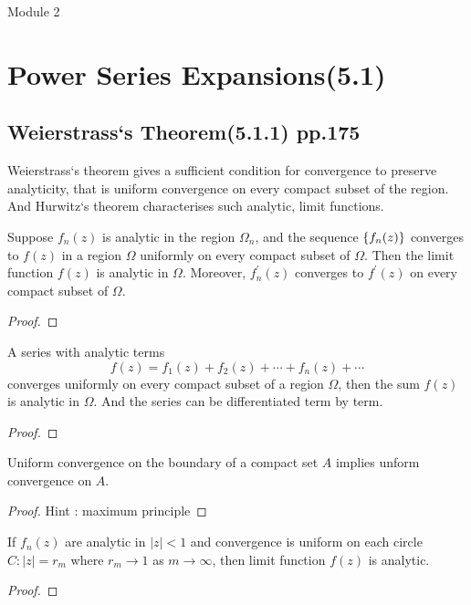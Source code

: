\pagebreak
{\Large Module 2}
\section{Power Series Expansions(5.1)}
\subsection{Weierstrass`s Theorem(5.1.1) pp.175}
\begin{important}
	Weierstrass`s theorem gives a sufficient condition for convergence to preserve analyticity, that is uniform convergence on every compact subset of the region. 
	And Hurwitz`s theorem characterises such analytic, limit functions.
\end{important}
\begin{theorem}[Weierstrass]
	Suppose $f_n(z)$ is analytic in the region $\Omega_n$, and the sequence $\left\{f_n(z)\right\}$ converges to $f(z)$ in a region $\Omega$ uniformly on every compact subset of $\Omega$. Then the limit function $f(z)$ is analytic in $\Omega$. Moreover, $f_n^\prime(z)$ converges to $f^\prime(z)$ on every compact subset of $\Omega$.
\end{theorem}
\begin{proof}
\end{proof}

\begin{remark}
	A series with analytic terms
	\[ f(z) = f_1(z) + f_2(z) + \dotsb + f_n(z) + \dotsb \]
	converges uniformly on every compact subset of a region $\Omega$, then the sum $f(z)$ is analytic in $\Omega$. And the series can be differentiated term by term.
\end{remark}
\begin{proof}
\end{proof}
\begin{remark}
	Uniform convergence on the boundary of a compact set $A$ implies unform convergence on $A$.
\end{remark}
\begin{proof}
	Hint : maximum principle
\end{proof}

\begin{remark}
	If $f_n(z)$ are analytic in $|z|<1$ and convergence is uniform on each circle $C : |z| = r_m$ where $r_m \to 1$ as $m \to \infty$, then limit function $f(z)$ is analytic.
\end{remark}
\begin{proof}
\end{proof}

